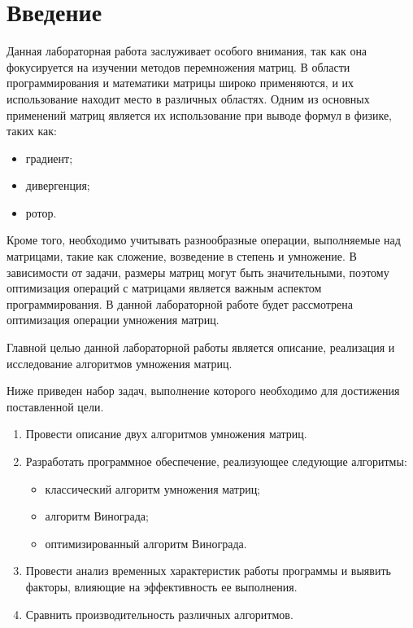 \chapter*{Введение}

Данная лабораторная работа заслуживает особого внимания, так как она фокусируется на изучении методов перемножения матриц. 
В области программирования и математики матрицы широко применяются, и их использование находит место в различных областях. 
Одним из основных применений матриц является их использование при выводе формул в физике, таких как:
\begin{itemize}
\item градиент;
\item дивергенция;
\item ротор.
\end{itemize}

Кроме того, необходимо учитывать разнообразные операции, выполняемые над матрицами, такие как сложение, возведение в степень и умножение. 
В зависимости от задачи, размеры матриц могут быть значительными, поэтому оптимизация операций с матрицами является важным аспектом программирования. 
В данной лабораторной работе будет рассмотрена оптимизация операции умножения матриц.

Главной целью данной лабораторной работы является описание, реализация и исследование алгоритмов умножения матриц.

Ниже приведен набор задач, выполнение которого необходимо для достижения поставленной цели.
\begin{enumerate}[label={\arabic*)}]
\item Провести описание двух алгоритмов умножения матриц.
\item Разработать программное обеспечение, реализующее следующие алгоритмы:
\begin{itemize}[label=---]
\item классический алгоритм умножения матриц;
\item алгоритм Винограда;
\item оптимизированный алгоритм Винограда.
\end{itemize}
\item Провести анализ временных характеристик работы программы и выявить факторы, влияющие на эффективность ее выполнения.
\item Сравнить производительность различных алгоритмов.
\end{enumerate}